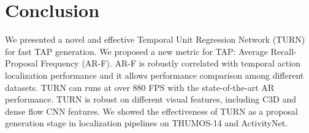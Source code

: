\documentclass[10pt,twocolumn,letterpaper]{article}
\begin{document}
 



\section{Conclusion}

We presented a novel and effective Temporal Unit Regression Network (TURN) for fast TAP generation. We proposed a new metric for TAP: Average Recall-Proposal Frequency (AR-F). AR-F is robustly correlated with temporal action localization performance and it allows performance comparison among different datasets. TURN can runs at over 880 FPS with the state-of-the-art AR performance. 
TURN is robust on different visual features, including C3D and dense flow CNN features. 
We showed the effectiveness of TURN as a proposal generation stage in localization pipelines on THUMOS-14 and ActivityNet. 


{\small


}
\end{document}
